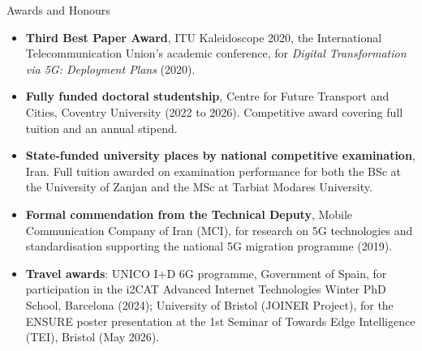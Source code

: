\documentclass{resume}
\begin{document}
\begin{rSection}{Awards and Honours}
\begin{itemize}
  \item \textbf{Third Best Paper Award}, ITU Kaleidoscope 2020, the International Telecommunication Union's academic conference, for \textit{Digital Transformation via 5G: Deployment Plans} (2020).
  \item \textbf{Fully funded doctoral studentship}, Centre for Future Transport and Cities, Coventry University (2022 to 2026). Competitive award covering full tuition and an annual stipend.
  \item \textbf{State-funded university places by national competitive examination}, Iran. Full tuition awarded on examination performance for both the BSc at the University of Zanjan and the MSc at Tarbiat Modares University.
  \item \textbf{Formal commendation from the Technical Deputy}, Mobile Communication Company of Iran (MCI), for research on 5G technologies and standardisation supporting the national 5G migration programme (2019).
  \item \textbf{Travel awards}: UNICO I+D 6G programme, Government of Spain, for participation in the i2CAT Advanced Internet Technologies Winter PhD School, Barcelona (2024); University of Bristol (JOINER Project), for the ENSURE poster presentation at the 1st Seminar of Towards Edge Intelligence (TEI), Bristol (May 2026).
\end{itemize}
\end{rSection}
\end{document}
